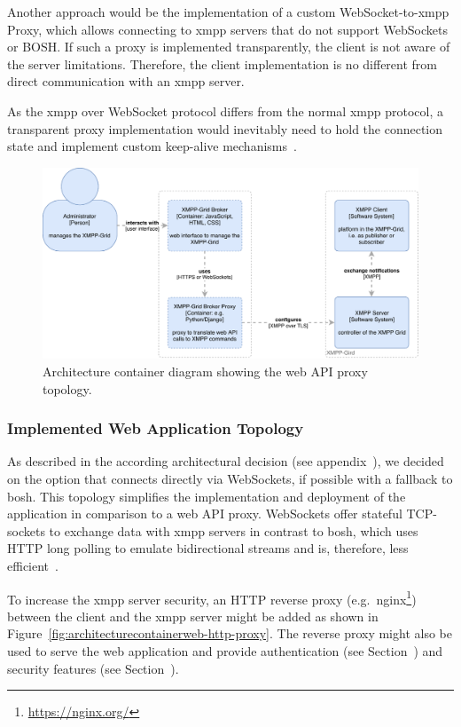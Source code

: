 Another approach would be the implementation of a custom WebSocket-to-\gls{xmpp} Proxy, which allows connecting to \gls{xmpp} servers that do not support WebSockets or BOSH.
If such a proxy is implemented transparently, the client is not aware of the server limitations.
Therefore, the client implementation is no different from direct communication with an \gls{xmpp} server.

As the \gls{xmpp} over WebSocket protocol differs from the normal \gls{xmpp} protocol, a transparent proxy implementation would inevitably need to hold the connection state and implement custom keep-alive mechanisms~\cite{rfc7395}.

\begin{figure}[H]
\centering
\includegraphics[width=0.8\linewidth]{resources/architecture_container_proxy}
\caption[Architecture container diagram: Web proxy]{Architecture container diagram showing the web API proxy topology.}
\label{fig:architecturecontainerwebproxy}
\end{figure}

\subsubsection{Implemented Web Application Topology}\label{sec:implemented-web-application-topology}

As described in the according architectural decision (see appendix~), we decided on the option that connects directly via WebSockets, if possible with a fallback to \gls{bosh}.
This topology simplifies the implementation and deployment of the application in comparison to a web API proxy.
WebSockets offer stateful TCP-sockets to exchange data with \gls{xmpp} servers in contrast to \gls{bosh}, which uses HTTP long polling to emulate bidirectional streams and is, therefore, less efficient~\cite{xep-0124}.

To increase the \gls{xmpp} server security, an HTTP reverse proxy (e.g.\ nginx\footnote{\url{https://nginx.org/}}) between the client and the \gls{xmpp} server might be added as shown in Figure~\ref{fig:architecturecontainerweb-http-proxy}.
The reverse proxy might also be used to serve the web application and provide authentication (see Section~) and security features (see Section~).


